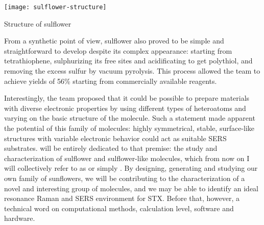 \begin{marginfigure}
    \texttt{[image: sulflower-structure]}
    \caption[Structure of sulflower]{Structure of sulflower}
\end{marginfigure}


From a synthetic point of view, sulflower also proved to be simple and straightforward to develop despite its complex appearance: starting from tetrathiophene, sulphurizing its free sites and acidificating to get polythiol, and removing the excess sulfur by vacuum pyrolysis.
This process allowed the team to achieve yields of 56\% starting from commercially available reagents.

Interestingly, the team proposed that it could be possible to prepare materials with diverse electronic properties by using different types of heteroatoms and varying on the basic structure of the molecule.
Such a statement made apparent the potential of this family of molecules: highly symmetrical, stable, surface-like structures with variable electronic behavior could act as suitable SERS substrates.
 will be entirely dedicated to that premise: the study and characterization of sulflower and sulflower-like molecules, which from now on I will collectively refer to as  or simply .
By designing, generating and studying our own family of sunflowers, we will be contributing to the characterization of a novel and interesting group of molecules, and we may be able to identify an ideal resonance Raman and SERS environment for STX.
Before that, however, a technical word on computational methods, calculation level, software and hardware.

